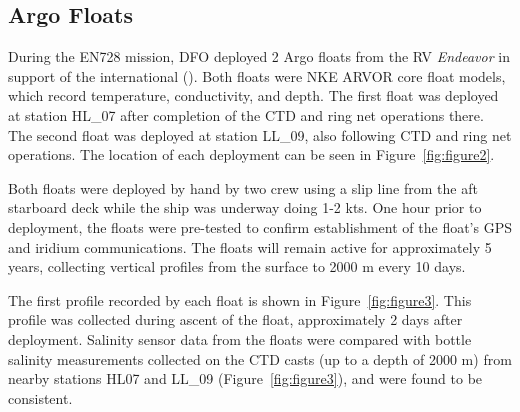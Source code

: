 \documentclass[12pt]{article}\usepackage[]{graphicx}\usepackage[]{color}
\begin{document}
\clearpage

\subsection{Argo Floats}\label{argo-floats}

During the EN728 mission, DFO deployed 2 Argo floats from the RV \emph{Endeavor} in support of the international  (). Both floats were NKE ARVOR core float models, which record temperature, conductivity, and depth. The first float was deployed at station HL\_07 after completion of the CTD and ring net operations there. The second float was deployed at station LL\_09, also following CTD and ring net operations. The location of each deployment can be seen in Figure~\ref{fig:figure2}.

Both floats were deployed by hand by two crew using a slip line from the aft starboard deck while the ship was underway doing 1-2 kts. One hour prior to deployment, the floats were pre-tested to confirm establishment of the float's GPS and iridium communications. The floats will remain active for approximately 5 years, collecting vertical profiles from the surface to 2000 m every 10 days.

The first profile recorded by each float is shown in Figure~\ref{fig:figure3}. This profile was collected during ascent of the float, approximately 2 days after deployment. Salinity sensor data from the floats were compared with bottle salinity measurements collected on the CTD casts (up to a depth of 2000 m) from nearby stations HL07 and LL\_09 (Figure~\ref{fig:figure3}), and were found to be consistent.
\end{document}
